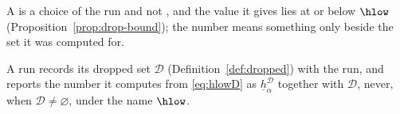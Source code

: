 
A  is a choice of the run and not ,
and the value it gives lies at or below $\hlow$
(Proposition~\ref{prop:drop-bound}); the number means something only
beside the set it was computed for.

\begin{requirement}\label{req:dropped-set-record}
A run records its dropped set $\mathcal{D}$ (Definition~\ref{def:dropped})
with the run, and reports the number it computes from \eqref{eq:hlowD} as
$\underline{h}^{\mathcal{D}}_{\alpha}$ together with $\mathcal{D}$, never,
when $\mathcal{D}\neq\varnothing$, under the name $\hlow$.
\end{requirement}
